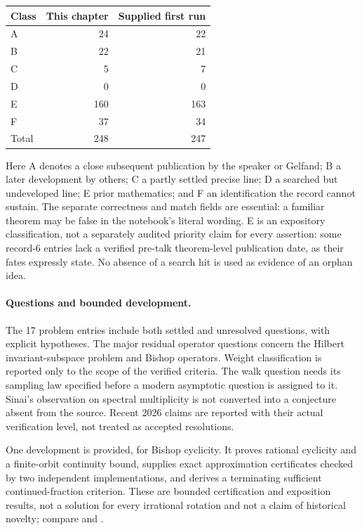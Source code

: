 \begin{center}
\begin{tabular}{@{}lrr@{}}\toprule
Class&This chapter&Supplied first run\\\midrule
A&24&22\\
B&22&21\\
C&5&7\\
D&0&0\\
E&160&163\\
F&37&34\\
\midrule Total&248&247\\\bottomrule
\end{tabular}
\end{center}
Here A denotes a close subsequent publication by the speaker or Gelfand;
B a later development by others; C a partly settled precise line; D a
searched but undeveloped line; E prior mathematics; and F an identification
the record cannot sustain.  The separate correctness and match fields are
essential: a familiar theorem may be false in the notebook's literal
wording.  E is an expository classification, not a separately audited
priority claim for every assertion: some record-6 entries lack a verified
pre-talk theorem-level publication date, as their fates expressly state.
No absence of a search hit is used as evidence of an orphan idea.

\paragraph{Questions and bounded development.}
The 17 problem entries include both settled and unresolved questions,
with explicit hypotheses.  The major residual operator questions concern
the Hilbert invariant-subspace problem and Bishop operators.  Weight
classification is reported only to the scope of the verified criteria.
The walk question needs its sampling law specified before a
modern asymptotic question is assigned to it.  Sinai's observation on
spectral multiplicity is not converted into a conjecture absent from the
source.  Recent 2026 claims are reported with their actual verification
level, not treated as accepted resolutions.

One development is provided, for Bishop cyclicity.  It proves rational
cyclicity and a finite-orbit continuity bound, supplies exact approximation
certificates checked by two independent implementations, and derives a
terminating sufficient continued-fraction criterion.  These are bounded
certification and exposition results, not a solution for every irrational
rotation and not a claim of historical novelty; compare
\citet{chamizo2020bishop} and \citet{behani2023bishop}.

